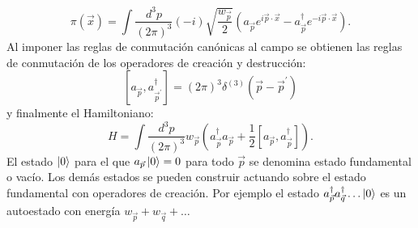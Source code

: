 \documentclass{article}
\theoremstyle{plain}
\theoremstyle{definition}
\begin{document}
	\[
	\pi(\vec{x})=\int\frac{d^3p}{(2\pi)^3}(-i)\sqrt{\frac{w_{\vec{p}}}{2}}\left(a_{\vec{p}}e^{i\vec{p}\cdot\vec{x}}-a^\dagger_{\vec{p}}e^{-i\vec{p}\cdot\vec{x}}\right)\text{.}
	\]
	Al imponer las reglas de conmutación canónicas al campo se obtienen las reglas de conmutación de los operadores de creación y destrucción:\[\left[a_{\vec{p}},a^\dagger_{\vec{p}^{\prime}}\right]=\left(2\pi\right)^3\delta^{(3)}\left(\vec{p}-\vec{p}^{\prime}\right)
	\]
	y finalmente el Hamiltoniano:\[
	H = \int\frac{d^3p}{(2\pi)^3}w_{\vec{p}}\left(a^\dagger_{\vec{p}}a_{\vec{p}}+\frac{1}{2}\left[a_{\vec{p}},a^\dagger_{\vec{p}}\right]\right)\text{.}
	\]
	El estado \(\ket{0} \) para el que \(a_{\vec{p}}\ket{0}=0\) para todo \(\vec{p} \) se denomina estado fundamental o vacío. Los demás estados se pueden construir actuando  sobre el estado fundamental con operadores de creación. Por ejemplo el estado \(a^\dagger_{\vec{p}}a^\dagger_{\vec{q}}\dots\ket{0} \) es un autoestado con energía \(w_{\vec{p}}+w_{\vec{q}}+\dots\)
\end{document}
